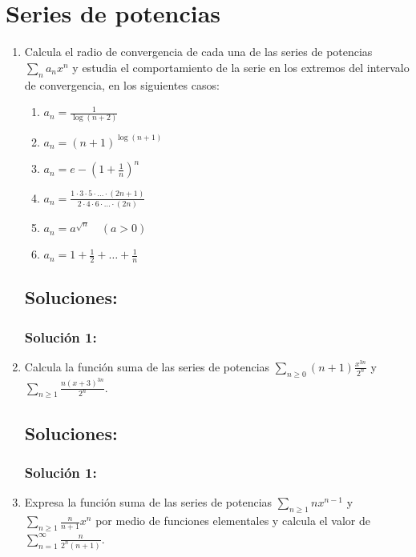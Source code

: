 \documentclass[a4paper, 11pt]{article} %
\begin{document}
\section*{Series de potencias}
\begin{enumerate}
	\item Calcula el radio de convergencia de cada una de las series de potencias $\displaystyle{\sum_n a_n x^n}$
	y estudia el comportamiento de la serie en los extremos del intervalo de convergencia, en los siguientes casos:
	\begin{enumerate}
		\item $\displaystyle{a_n = \frac{1}{\log (n+2)}}$
		\item $a_n = (n+1)^{\log (n+1)}$
		\item $\displaystyle{a_n = e - \left(1+ \frac{1}{n}\right)^n}$
		\item $\displaystyle{a_n = \frac{1 \cdot 3 \cdot 5 \cdot \dots \cdot (2n+1)}{2 \cdot 4 \cdot 6 \cdot \dots \cdot (2n)}}$
		\item $a_n = a^{\sqrt{n}} \quad (a > 0)$
		\item $\displaystyle{a_n = 1 + \frac{1}{2} + \dots + \frac{1}{n}}$
	\end{enumerate}
	\subsection*{Soluciones:}
		\subsubsection*{Solución 1:}
	
	\item Calcula la función suma de las series de potencias $\displaystyle{\sum_{n \geq 0} (n+1) \frac{x^{3n}}{2^n}}$
	y $\displaystyle{\sum_{n \geq 1} \frac{n(x+3)^{3n}}{2^n}}$.
	\subsection*{Soluciones:}
		\subsubsection*{Solución 1:}
	
	\item Expresa la función suma de las series de potencias $\displaystyle{\sum_{n \geq 1} nx^{n-1}}$ y
	$\displaystyle{\sum_{n \geq 1} \frac{n}{n+1}x^n}$ por medio de funciones elementales y calcula el valor de
	$\displaystyle{\sum^{\infty}_{n = 1} \frac{n}{2^n(n+1)}}$.

\end{enumerate}
\end{document}
